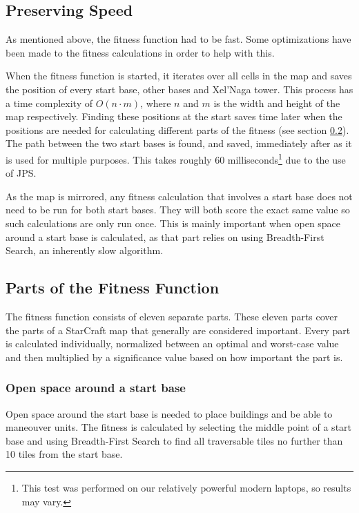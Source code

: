\subsection{Preserving Speed}
\label{methodology_mapfitness_speed}

As mentioned above, the fitness function had to be fast. Some optimizations have been made to the fitness calculations in order to help with this.

When the fitness function is started, it iterates over all cells in the map and saves the position of every start base, other bases and Xel'Naga tower. This process has a time complexity of $O(n\cdot m)$, where $n$ and $m$ is the width and height of the map respectively. Finding these positions at the start saves time later when the positions are needed for calculating different parts of the fitness (see section \ref{methodology_mapfitness_parts}). The path between the two start bases is found, and saved, immediately after as it is used for multiple purposes. This takes roughly 60 milliseconds\footnote{This test was performed on our relatively powerful modern laptops, so results may vary.} due to the use of JPS.

As the map is mirrored, any fitness calculation that involves a start base does not need to be run for both start bases. They will both score the exact same value so such calculations are only run once. This is mainly important when open space around a start base is calculated, as that part relies on using Breadth-First Search, an inherently slow algorithm.

\subsection{Parts of the Fitness Function}
\label{methodology_mapfitness_parts}

The fitness function consists of eleven separate parts. These eleven parts cover the parts of a StarCraft map that generally are considered important. Every part is calculated individually, normalized between an optimal and worst-case value and then multiplied by a significance value based on how important the part is.

	\subsubsection*{Open space around a start base} 
	Open space around the start base is needed to place buildings and be able to maneouver units. The fitness is calculated by selecting the middle point of a start base and using Breadth-First Search to find all traversable tiles no further than 10 tiles from the start base.

